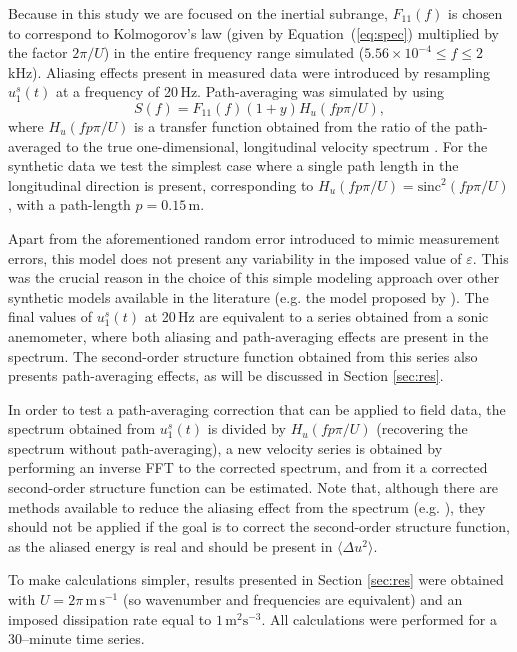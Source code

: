 \documentclass{svjour3}                     %
\begin{document}
Because in this study we are focused on the inertial subrange,
$F_{11}(f)$ is chosen to correspond to Kolmogorov's law (given by
Equation~(\ref{eq:spec}) multiplied by the factor $2\pi/U$) in the
entire frequency range simulated ($5.56\times 10^{-4} \le f \le
2$\,kHz). Aliasing effects present in measured data were introduced by
resampling $u_1^s(t)$ at a frequency of 20\,Hz. Path-averaging was
simulated by using
\begin{equation}
S(f) = F_{11}(f)(1 + y)H_u(fp\pi/U),
\end{equation} 
where $H_u(fp\pi/U)$ is a transfer function obtained from the ratio of
the path-averaged to the true one-dimensional, longitudinal velocity
spectrum \citep{KaiWyn1968,HorOnc2006}. For the synthetic data we test
the simplest case where a single path length in the longitudinal
direction is present, corresponding to $H_u(fp\pi/U) =
\mathrm{sinc}^2(fp\pi/U)$, with a path-length $p = 0.15$\,m.

Apart from the aforementioned random error introduced to mimic measurement
errors, this model does not present any variability in the imposed value of
$\varepsilon$. This was the crucial reason in the choice of this simple modeling
approach over other synthetic models available in the literature (e.g. the model
proposed by \citet{JunLat1994}). The final values of $u_1^s(t)$ at 20\,Hz are
equivalent to a series obtained from a sonic anemometer, where both
aliasing and path-averaging effects are present in the spectrum. The
second-order structure function obtained from this series also presents
path-averaging effects, as will be discussed in Section \ref{sec:res}.

In order to test a path-averaging correction that can be applied to
field data, the spectrum obtained from $u_1^s(t)$ is divided by
$H_u(fp\pi/U)$ (recovering the spectrum without path-averaging), a new
velocity series is obtained by performing an inverse FFT to the
corrected spectrum, and from it a corrected second-order structure
function can be estimated. Note that, although there are methods
available to reduce the aliasing effect from the spectrum
(e.g. \citet{ChaDia2004}), they should not be applied if the goal is
to correct the second-order structure function, as the aliased energy
is real and should be present in $\langle \Delta u^2\rangle$.

To make calculations simpler, results presented in Section
\ref{sec:res} were obtained with $U = 2\pi\,\mathrm{m\,s^{-1}}$ (so
wavenumber and frequencies are equivalent) and an imposed dissipation
rate equal to $1\,\mathrm{m^2s^{-3}}$. All calculations were performed
for a 30--minute time series.
\end{document}
